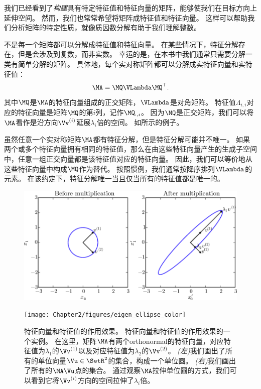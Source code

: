 我们已经看到了\emph{构建}具有特定特征值和特征向量的矩阵，能够使我们在目标方向上延伸空间。
然而，我们也常常希望将矩阵成特征值和特征向量。
这样可以帮助我们分析矩阵的特定性质，就像质因数分解有助于我们理解整数。


不是每一个矩阵都可以分解成特征值和特征向量。
在某些情况下，特征分解存在，但是会涉及到复数，而非实数。
幸运的是，在本书中我们通常只需要分解一类有简单分解的矩阵。
具体地，每个实对称矩阵都可以分解成实特征向量和实特征值：
\begin{equation}
    \MA = \MQ \VLambda \MQ^\top.
\end{equation}
其中$\MQ$是$\MA$的特征向量组成的正交矩阵，$\VLambda$是对角矩阵。
特征值$\Lambda_{i,i}$对应的特征向量是矩阵$\MQ$的第$i$列，记作$\MQ_{:,i}$。
因为$\MQ$是正交矩阵，我们可以将$\MA$看作是沿方向$\Vv^{(i)}$延展$\lambda_i$倍的空间。
如所示的例子。


虽然任意一个实对称矩阵$\MA$都有特征分解，但是特征分解可能并不唯一。
如果两个或多个特征向量拥有相同的特征值，那么在由这些特征向量产生的生成子空间中，任意一组正交向量都是该特征值对应的特征向量。
因此，我们可以等价地从这些特征向量中构成$\MQ$作为替代。
按照惯例，我们通常按降序排列$\VLambda$的元素。
在该约定下，特征分解唯一当且仅当所有的特征值都是唯一的。

\begin{figure}[!htb]
\ifOpenSource
\centerline{\includegraphics[scale=0.5]{images/15.png}}
\else
\centerline{\texttt{[image: Chapter2/figures/eigen\_ellipse\_color]}}
\fi
\caption{特征向量和特征值的作用效果。
特征向量和特征值的作用效果的一个实例。
在这里，矩阵$\MA$有两个\gls{orthonormal}的特征向量，对应特征值为$\lambda_1$的$\Vv^{(1)}$以及对应特征值为$\lambda_2$的$\Vv^{(2)}$。
\emph{(左)}我们画出了所有的单位向量$\Vu\in\SetR^2$的集合，构成一个单位圆。
\emph{(右)}我们画出了所有的$\MA\Vu$点的集合。
通过观察$\MA$拉伸单位圆的方式，我们可以看到它将$\Vv^{(i)}$方向的空间拉伸了$\lambda_i$倍。	}
\label{fig:chap2_eigen_ellipse}
\end{figure}

